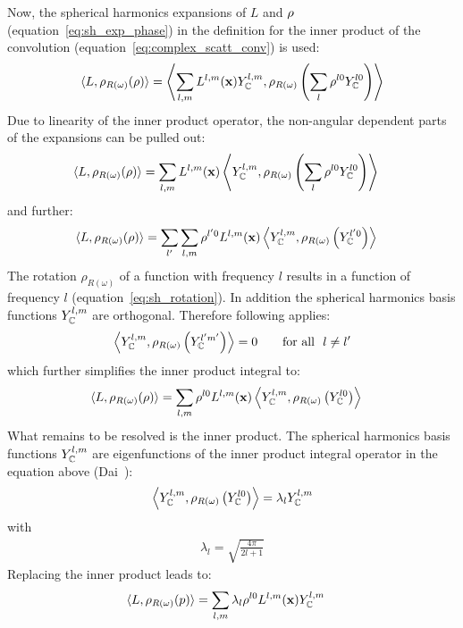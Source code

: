 Now, the spherical harmonics expansions of $L$ and $\rho$ (equation~\ref{eq:sh_exp_phase}) in the definition for the inner product of the convolution (equation~\ref{eq:complex_scatt_conv}) is used:
\begin{align*}
\langle L,  \rho_{R(\omega)}(\rho)\rangle = \left < \sum_{l,m}{L^{l,m}(\mathbf{x}) Y_{\mathbb{C}}^{l,m}}, \rho_{R(\omega)}\left ( \sum_{l}{\rho^{l0}Y_{\mathbb{C}}^{l0}} \right )\right>
\end{align*}
Due to linearity of the inner product operator, the non-angular dependent parts of the expansions can be pulled out:
\begin{align*}
\langle L,  \rho_{R(\omega)}(\rho)\rangle
&=
\sum_{l,m}
{
L^{l,m}(\mathbf{x})
\left<
Y_{\mathbb{C}}^{l,m},
\rho_{R(\omega)}
\left(\sum_l{\rho^{l0} Y_{\mathbb{C}}^{l0}}\right)
\right>
}
\end{align*}
and further:
\begin{align*}
\langle L,  \rho_{R(\omega)}(\rho)\rangle
&=
\sum_{l'}
{
\sum_{l,m}
{
\rho^{l'0}L^{l,m}(\mathbf{x})
\left<Y_{\mathbb{C}}^{l,m}, \rho_{R(\omega)}\left( Y_{\mathbb{C}}^{l'0} \right)\right>
}
}
\end{align*}
The rotation $\rho_{R(\omega)}$ of a function with frequency $l$ results in a function of frequency $l$ (equation~\ref{eq:sh_rotation}). In addition the spherical harmonics basis functions $Y_{\mathbb{C}}^{l,m}$ are orthogonal. Therefore following applies:
\begin{align*}
\left<
Y_{\mathbb{C}}^{l,m}, \rho_{R(\omega)}\left(Y_{\mathbb{C}}^{l'm'}\right)
\right> = 0       \qquad    \text{for all}\ \ l\ne l' 
\end{align*}
which further simplifies the inner product integral to:
\begin{align*}
\langle L,  \rho_{R(\omega)}(\rho)\rangle
&=
\sum_{l,m}
{
\rho^{l0}L^{l,m}(\mathbf{x})
\left<
Y_{\mathbb{C}}^{l,m}, \rho_{R(\omega)}\left(Y_{\mathbb{C}}^{l0} \right )
\right>
}
\end{align*}
What remains to be resolved is the inner product. The spherical harmonics basis functions $ Y_{\mathbb{C}}^{l,m}$ are eigenfunctions of the inner product integral operator in the equation above (Dai~\cite{Dai13}):
\begin{align*}
\left<
Y_{\mathbb{C}}^{l,m}, \rho_{R(\omega)}\left ( Y_{\mathbb{C}}^{l0} \right )\right> = \lambda_l Y_{\mathbb{C}}^{l,m}
\end{align*}
with
\begin{align*}
\lambda_l=\sqrt{\frac{4\pi}{2l+1}}
\end{align*}
Replacing the inner product leads to:
\begin{align*}
\langle L,  \rho_{R(\omega)}(p)\rangle
&=
\sum_{l,m}
{
\lambda_l
\rho^{l0}L^{l,m}(\mathbf{x})
Y_{\mathbb{C}}^{l,m}
}
\end{align*}
